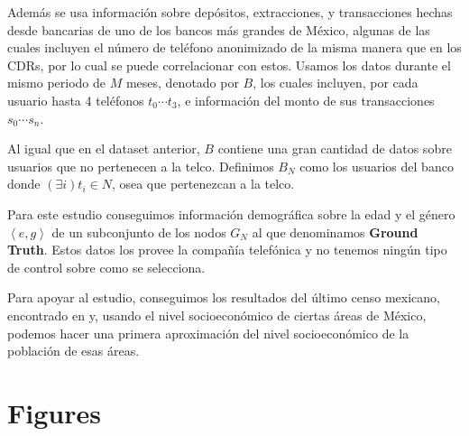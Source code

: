 \documentclass[
10pt,
spanish,
singlespacing, %
parskip, %
headsepline, %
twocolumn
]{article} %
\begin{document}
Además se usa información sobre depósitos, extracciones, y transacciones hechas desde bancarias de uno de los bancos más grandes de México, algunas de las cuales incluyen el número de teléfono anonimizado de la misma manera que en los CDRs, por lo cual se puede correlacionar con estos. Usamos los datos durante el mismo periodo de \( M \) meses, denotado por \( B \), los cuales incluyen, por cada usuario hasta 4 teléfonos \( t_0 \cdots t_3 \), e información del monto de sus transacciones \( s_0 \cdots s_n \).

Al igual que en el dataset anterior, \( B \) contiene una gran cantidad de datos sobre usuarios que no pertenecen a la telco. Definimos \( B_N \) como los usuarios del banco donde \( \left( \exists i \right) t_i \in N \), osea que pertenezcan a la telco.

Para este estudio conseguimos información demográfica sobre la edad y el género \( \left<e, g\right> \) de un subconjunto de los nodos \( G_N \) al que denominamos \textbf{Ground Truth}. Estos datos los provee la compañía telefónica y no tenemos ningún tipo de control sobre como se selecciona.

Para apoyar al estudio, conseguimos los resultados del último censo mexicano, encontrado en  y, usando el nivel socioeconómico de ciertas áreas de México, podemos hacer una primera aproximación del nivel socioeconómico de la población de esas áreas.

\section{Figures}
\end{document}
